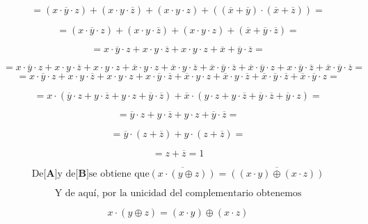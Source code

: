 \documentclass[
]{article}
\begin{document}
\begin{enumerate}
\begin{enumerate}
\begin{enumerate}
\begin{enumerate}
        \[{= {{{{({{x \cdot \overline{y}} \cdot z})} + {({{x \cdot y} \cdot \overline{z}})}} + {({{x \cdot y} \cdot z})}} + {({{({\overline{x} + \overline{y}})} \cdot {({\overline{x} + \overline{z}})}})}}} =\]

        \[{= {{{{({{x \cdot \overline{y}} \cdot z})} + {({{x \cdot y} \cdot \overline{z}})}} + {({{x \cdot y} \cdot z})}} + {({\overline{x} + {\overline{y} \cdot \overline{z}}})}}} =\]

        \[{= {{{{{{x \cdot \overline{y}} \cdot z} + {{x \cdot y} \cdot \overline{z}}} + {{x \cdot y} \cdot z}} + \overline{x}} + {\overline{y} \cdot \overline{z}}}} =\]

        \[{= {{{{{{{{{{x \cdot \overline{y}} \cdot z} + {{x \cdot y} \cdot \overline{z}}} + {{x \cdot y} \cdot z}} + {{\overline{x} \cdot y} \cdot z}} + {{\overline{x} \cdot y} \cdot \overline{z}}} + {{\overline{x} \cdot \overline{y}} \cdot \overline{z}}} + {{\overline{x} \cdot \overline{y}} \cdot z}} + {{x \cdot \overline{y}} \cdot \overline{z}}} + {{\overline{x} \cdot \overline{y}} \cdot \overline{z}}}} =\]
        \[{= {{{{{{{{{x \cdot \overline{y}} \cdot z} + {{x \cdot y} \cdot \overline{z}}} + {{x \cdot y} \cdot z}} + {{x \cdot \overline{y}} \cdot \overline{z}}} + {{\overline{x} \cdot y} \cdot z}} + {{\overline{x} \cdot y} \cdot \overline{z}}} + {{\overline{x} \cdot \overline{y}} \cdot \overline{z}}} + {{\overline{x} \cdot \overline{y}} \cdot z}}} =\]

        \[{= {{x \cdot {({{{{\overline{y} \cdot z} + {y \cdot \overline{z}}} + {y \cdot z}} + {\overline{y} \cdot \overline{z}}})}} + {\overline{x} \cdot {({{{{y \cdot z} + {y \cdot \overline{z}}} + {\overline{y} \cdot \overline{z}}} + {\overline{y} \cdot z}})}}}} =\]

        \[{= {{{{\overline{y} \cdot z} + {y \cdot \overline{z}}} + {y \cdot z}} + {\overline{y} \cdot \overline{z}}}} =\]

        \[{= {{\overline{y} \cdot {({z + \overline{z}})}} + {y \cdot {({z + \overline{z}})}}}} =\]

        \[{= {z + \overline{z}}} = 1\]

        \[\text{De}{\lbrack\mathbf{A}\rbrack}\text{y de}{\lbrack\mathbf{B}\rbrack}\text{se obtiene que}{\overline{({x\cdot{({y\oplus z})}})} = \overline{({{({x\cdot y})}\oplus{({x\cdot z})}})}}\]

        \[\text{Y de aquí, por la unicidad del complementario obtenemos}\]

        \[{{x \cdot {({y \oplus z})}} = {({x \cdot y})}} \oplus {({x \cdot z})}\]


\end{enumerate}
\end{enumerate}
\end{enumerate}
\end{enumerate}
\end{document}
